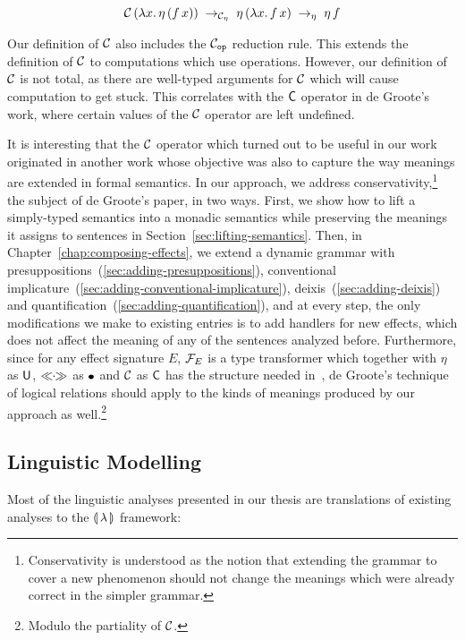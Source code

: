 $$
\mathcal{C}\,(\lambda x.\, \eta\,(f\,x)) \; \to_{\mathcal{C}_\eta} \;
\eta\,(\lambda x.\, f\,x) \; \to_\eta \; \eta\,f
$$

Our definition of $\mathcal{C}$ also includes the $\mathcal{C}_{\mathtt{op}}$ reduction
rule. This extends the definition of $\mathcal{C}$ to computations which use
operations. However, our definition of $\mathcal{C}$ is not total, as there are
well-typed arguments for $\mathcal{C}$ which will cause computation to get
stuck. This correlates with the $\mathsf{C}$ operator in de Groote's work, where
certain values of the $\mathcal{C}$ operator are left undefined.

It is interesting that the $\mathcal{C}$ operator which turned out to be useful in
our work originated in another work whose objective was also to capture the
way meanings are extended in formal semantics. In our approach, we address
conservativity,\footnote{Conservativity is understood as the notion that
  extending the grammar to cover a new phenomenon should not change the
  meanings which were already correct in the simpler grammar.} the subject
of de Groote's paper, in two ways. First, we show how to lift a
simply-typed semantics into a monadic semantics while preserving the
meanings it assigns to sentences in
Section~\ref{sec:lifting-semantics}. Then, in
Chapter~\ref{chap:composing-effects}, we extend a dynamic grammar with
presuppositions~(\ref{sec:adding-presuppositions}), conventional
implicature~(\ref{sec:adding-conventional-implicature}),
deixis~(\ref{sec:adding-deixis}) and
quantification~(\ref{sec:adding-quantification}), and at every step, the
only modifications we make to existing entries is to add handlers for new
effects, which does not affect the meaning of any of the sentences analyzed
before. Furthermore, since for any effect signature $E$, $\mathcal{F}_E$ is a type
transformer which together with $\eta$ as $\mathsf{U}$, $\mathbin{\ll\!\!\cdot\!\!\gg}$ as $\mathbin{\bullet}$ and
$\mathcal{C}$ as $\mathsf{C}$ has the structure needed
in~\cite{degroote2015conservativity}, de Groote's technique of logical
relations should apply to the kinds of meanings produced by our approach as
well.\footnote{Modulo the partiality of $\mathcal{C}$.}


\subsection{Linguistic Modelling}
\label{ssec:comparison-linguistic}

Most of the linguistic analyses presented in our thesis are translations of
existing analyses to the ${\llparenthesis \, \lambda \, \rrparenthesis}$ framework:

